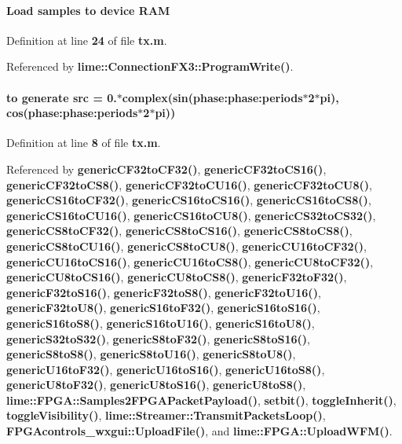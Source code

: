 \paragraph[{R\+AM}]{\setlength{\rightskip}{0pt plus 5cm}Load {\bf samples} to {\bf device} R\+AM}\label{tx_8m_af6d116d80d57c197cfb87b73c3c2586e}


Definition at line {\bf 24} of file {\bf tx.\+m}.



Referenced by {\bf lime\+::\+Connection\+F\+X3\+::\+Program\+Write()}.

\paragraph[{src}]{ to generate src = 0.$\ast$complex(sin(phase\+:phase\+:periods$\ast$2$\ast$pi), cos(phase\+:phase\+:periods$\ast$2$\ast$pi))}\label{tx_8m_a7d34a8189f5209146e79e4de490a8022}


Definition at line {\bf 8} of file {\bf tx.\+m}.



Referenced by {\bf generic\+C\+F32to\+C\+F32()}, {\bf generic\+C\+F32to\+C\+S16()}, {\bf generic\+C\+F32to\+C\+S8()}, {\bf generic\+C\+F32to\+C\+U16()}, {\bf generic\+C\+F32to\+C\+U8()}, {\bf generic\+C\+S16to\+C\+F32()}, {\bf generic\+C\+S16to\+C\+S16()}, {\bf generic\+C\+S16to\+C\+S8()}, {\bf generic\+C\+S16to\+C\+U16()}, {\bf generic\+C\+S16to\+C\+U8()}, {\bf generic\+C\+S32to\+C\+S32()}, {\bf generic\+C\+S8to\+C\+F32()}, {\bf generic\+C\+S8to\+C\+S16()}, {\bf generic\+C\+S8to\+C\+S8()}, {\bf generic\+C\+S8to\+C\+U16()}, {\bf generic\+C\+S8to\+C\+U8()}, {\bf generic\+C\+U16to\+C\+F32()}, {\bf generic\+C\+U16to\+C\+S16()}, {\bf generic\+C\+U16to\+C\+S8()}, {\bf generic\+C\+U8to\+C\+F32()}, {\bf generic\+C\+U8to\+C\+S16()}, {\bf generic\+C\+U8to\+C\+S8()}, {\bf generic\+F32to\+F32()}, {\bf generic\+F32to\+S16()}, {\bf generic\+F32to\+S8()}, {\bf generic\+F32to\+U16()}, {\bf generic\+F32to\+U8()}, {\bf generic\+S16to\+F32()}, {\bf generic\+S16to\+S16()}, {\bf generic\+S16to\+S8()}, {\bf generic\+S16to\+U16()}, {\bf generic\+S16to\+U8()}, {\bf generic\+S32to\+S32()}, {\bf generic\+S8to\+F32()}, {\bf generic\+S8to\+S16()}, {\bf generic\+S8to\+S8()}, {\bf generic\+S8to\+U16()}, {\bf generic\+S8to\+U8()}, {\bf generic\+U16to\+F32()}, {\bf generic\+U16to\+S16()}, {\bf generic\+U16to\+S8()}, {\bf generic\+U8to\+F32()}, {\bf generic\+U8to\+S16()}, {\bf generic\+U8to\+S8()}, {\bf lime\+::\+F\+P\+G\+A\+::\+Samples2\+F\+P\+G\+A\+Packet\+Payload()}, {\bf setbit()}, {\bf toggle\+Inherit()}, {\bf toggle\+Visibility()}, {\bf lime\+::\+Streamer\+::\+Transmit\+Packets\+Loop()}, {\bf F\+P\+G\+Acontrols\+\_\+wxgui\+::\+Upload\+File()}, and {\bf lime\+::\+F\+P\+G\+A\+::\+Upload\+W\+F\+M()}.

